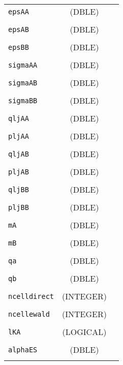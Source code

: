 \documentclass[10pt,a4paper]{article}
\begin{document}
\begin{tabular}{lcc}
\\
\verb?epsAA? &   (DBLE)  & \\
\\
\verb?epsAB? &   (DBLE)  & \\
\\
\verb?epsBB? &  (DBLE)  & \\
\\
\verb?sigmaAA? & (DBLE)  & \\
\\
\verb?sigmaAB? & (DBLE)  & \\
\\
\verb?sigmaBB? & (DBLE)  & \\
\\
\verb?qljAA? &  (DBLE)  & \\
\\
\verb?pljAA? &  (DBLE)  & \\
\\
\verb?qljAB? &  (DBLE)  & \\
\\
\verb?pljAB? &  (DBLE)  & \\
\\
\verb?qljBB? &  (DBLE)  & \\
\\
\verb?pljBB? &  (DBLE)  & \\
\\
\verb?mA?   &   (DBLE)  & \\
\\
\verb?mB?   &   (DBLE)  & \\
\\
\verb?qa?   &    (DBLE)  & \\
\\
\verb?qb?   &    (DBLE)  & \\
\\
\verb?ncelldirect? & (INTEGER)  & \\
\\
\verb?ncellewald?  &  (INTEGER)  & \\
\\
\verb?lKA?         &  (LOGICAL)  & \\
\\
\verb?alphaES?     &  (DBLE)  & \\
\\
\end{tabular}

\end{document}

